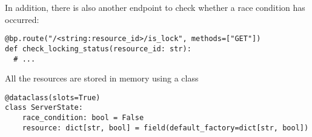 In addition, there is also another endpoint to check whether a race condition 
has occurred:

\begin{listing}[H]
  \begin{verbatim}
@bp.route("/<string:resource_id>/is_lock", methods=["GET"])
def check_locking_status(resource_id: str):
  # ...
  \end{verbatim}
\end{listing}

All the resources are stored in memory using a class 

\begin{listing}[!ht]
  \begin{verbatim}
@dataclass(slots=True)
class ServerState:
    race_condition: bool = False
    resource: dict[str, bool] = field(default_factory=dict[str, bool])
  \end{verbatim}
\end{listing}


